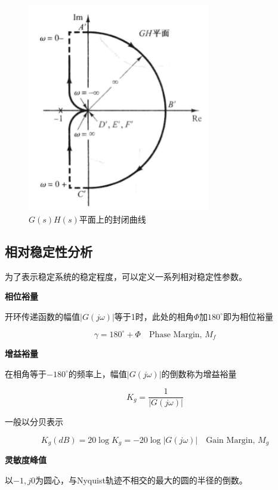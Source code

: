\begin{figure}[!ht]
    \centering
    \includegraphics[width=8cm]{figures/28.png}
    \caption{$G(s)H(s)$平面上的封闭曲线}
    \label{28}
\end{figure}

\subsection{相对稳定性分析}

为了表示稳定系统的稳定程度，可以定义一系列相对稳定性参数。

\textbf{相位裕量}

开环传递函数的幅值$|G(j\omega)|$等于1时，此处的相角$\Phi$加$180^\circ$即为相位裕量

\begin{equation*}
    \gamma=180^\circ + \Phi\quad\mbox{Phase Margin, }M_f
\end{equation*}

\textbf{增益裕量}

在相角等于$-180^\circ$的频率上，幅值$|G(j\omega)|$的倒数称为增益裕量

\begin{equation*}
    K_g=\frac{1}{|G(j\omega)|}
\end{equation*}

一般以分贝表示

\begin{equation*}
    K_g(dB)=20\log K_g=-20\log |G(j\omega)|\quad\mbox{Gain Margin, }M_g
\end{equation*}

\textbf{灵敏度峰值}

以$-1,j0$为圆心，与Nyquist轨迹不相交的最大的圆的半径的倒数。

